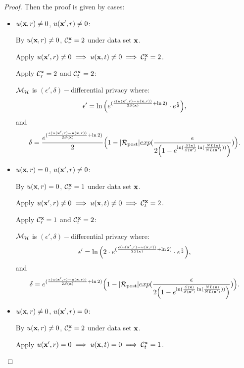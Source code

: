 \documentclass{article}
\begin{document}
\begin{proof}
 Then the proof is given by cases:
  \begin{itemize}
    \item {\boldmath$u(\textbf{x}, {r}) \neq 0$, $u(\textbf{x}', {r}) \neq 0$}:

      By $u(\textbf{x}, {r}) \neq 0$, $\mathcal{C}^{\textbf{x}}_{r} = 2$ under data set $\textbf{x}$.

      Apply $u(\textbf{x}', {r}) \neq 0 \implies u(\textbf{x}, {t}) \neq 0 \implies \mathcal{C}^{\textbf{x}}_{t} = 2$.

      Apply  $\mathcal{C}^{\textbf{x}}_{r} = 2$ and  $\mathcal{C}^{\textbf{x}}_{t} = 2$:

      $\mathcal{M}_{\mathcal{H}}$ is $(\epsilon', \delta)-$differential privacy where:
      $$
      \epsilon' = \ln \Big( e^{(\frac{\epsilon (u(\textbf{x}', {r}) - u(\textbf{x}, {r}))}{2 S(\textbf{x})} + \ln 2)} \cdot e^{\frac{\epsilon}{2}} \Big),
      $$ and
      $$
      \delta = \frac{e^{(\frac{\epsilon (u(\textbf{x}', {r}) - u(\textbf{x}, {r}))}{2 S(\textbf{x})} + \ln 2)}}{2}
      \Big( 1 - |\mathcal{R}_{\textup{post}}|exp(\frac{\epsilon}{2 \Big(1 - e ^ {\ln(\frac{S(\textbf{x})}{S(\textbf{x}')} \ln(\frac{NL(\textbf{x})}{NL(\textbf{x}')}))} \Big)}) \Big).
      $$ 

    \item {\boldmath$u(\textbf{x}, {r}) = 0$, $u(\textbf{x}', {r}) \neq 0$}:

      By $u(\textbf{x}, {r}) = 0$, $\mathcal{C}^{\textbf{x}}_{r} = 1$ under data set $\textbf{x}$.
      
      Apply $u(\textbf{x}', {r}) \neq 0 \implies u(\textbf{x}, {t}) \neq 0 \implies \mathcal{C}^{\textbf{x}}_{t} = 2$.

      Apply  $\mathcal{C}^{\textbf{x}}_{r} = 1$ and  $\mathcal{C}^{\textbf{x}}_{t} = 2$:

      $\mathcal{M}_{\mathcal{H}}$ is $(\epsilon', \delta)-$differential privacy where:
      $$
      \epsilon' = \ln \Big( 2 \cdot e^{(\frac{\epsilon (u(\textbf{x}', {r}) - u(\textbf{x}, {r}))}{2 S(\textbf{x})} + \ln 2)} \cdot e^{\frac{\epsilon}{2}} \Big),
      $$ and
      $$
      \delta = e^{(\frac{\epsilon (u(\textbf{x}', {r}) - u(\textbf{x}, {r}))}{2 S(\textbf{x})} + \ln 2)}
      \Big( 1 - |\mathcal{R}_{\textup{post}}|exp(\frac{\epsilon}{2 \Big( 1 - e ^ {\ln(\frac{S(\textbf{x})}{S(\textbf{x}')} \ln(\frac{NL(\textbf{x})}{NL(\textbf{x}')}))}\Big) }) \Big).
      $$ 
      

    \item {\boldmath$u(\textbf{x}, {r}) \neq 0$, $u(\textbf{x}', {r}) = 0$}:

      By $u(\textbf{x}, {r}) \neq 0$, $\mathcal{C}^{\textbf{x}}_{r} = 2$ under data set $\textbf{x}$.
      
      Apply $u(\textbf{x}', {r}) = 0 \implies u(\textbf{x}, {t}) = 0 \implies \mathcal{C}^{\textbf{x}}_{t} = 1$.


\end{itemize}
\end{proof}
\end{document}
